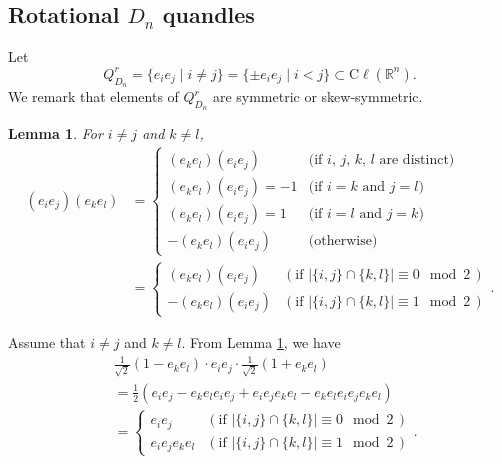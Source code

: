 \documentclass{amsart}
\newtheorem{lemma}[theorem]{Lemma}
\theoremstyle{definition}
\theoremstyle{remark}
\numberwithin{equation}{section}
\newcommand{\Cl}{\mathrm{C\ell}}
\begin{document}
\subsection{Rotational $D_n$ quandles}
Let 
\[
Q^r_{D_n} = \{ e_i e_j \mid i \neq j \} = \{ \pm e_i e_j \mid i < j \} \subset \Cl (\mathbb{R}^n).
\]
We remark that elements of $Q^r_{D_n}$ are symmetric or skew-symmetric.
\begin{lemma}
\label{lem:symmetric_or_skew_symmetric}
For $i \neq j$ and $k \neq l$, 
\begin{equation}
\begin{split}
(e_i e_j) (e_k e_l) &= 
\begin{cases}
(e_k e_l) (e_i e_j) & \textrm{(if $i$, $j$, $k$, $l$ are distinct)}\\
(e_k e_l) (e_i e_j) = -1 & \textrm{(if $i = k$ and $j = l$)}\\
(e_k e_l) (e_i e_j) = 1 & \textrm{(if $i = l$ and $j = k$)}\\
-(e_k e_l) (e_i e_j) & \textrm{(otherwise)}
\end{cases} \\
&= 
\begin{cases}
(e_k e_l) (e_i e_j) & (\textrm{if $| \{ i, j \} \cap \{ k , l \} | \equiv 0 \mod 2$} \, ) \\
-(e_k e_l) (e_i e_j) & (\textrm{if $| \{ i, j \} \cap \{ k , l \} | \equiv 1 \mod 2$} \, )
\end{cases}.
\end{split}
\end{equation}
\end{lemma}
Assume that $i \neq j$ and $k \neq l$.
From Lemma \ref{lem:symmetric_or_skew_symmetric},  we have
\begin{equation}
\label{eq:action_on_the_wedge_product}
\begin{split}
& \frac{1}{\sqrt{2}} (1 - e_k e_l) \cdot e_i e_j \cdot \frac{1}{\sqrt{2}} (1 + e_k e_l) \\
&= \frac{1}{2} (e_i e_j - e_k e_l e_i e_j + e_i e_j e_k e_l - e_k e_l e_i e_j e_k e_l) \\
&= \begin{cases} 
e_i e_j & ( \textrm{if $| \{ i, j \} \cap \{ k , l \} | \equiv 0 \mod 2$} \, ) \\
e_i e_j e_k e_l & ( \textrm{if $| \{ i, j \} \cap \{ k , l \} | \equiv 1 \mod 2$} \, )
\end{cases}.
\end{split}
\end{equation}
\end{document}
